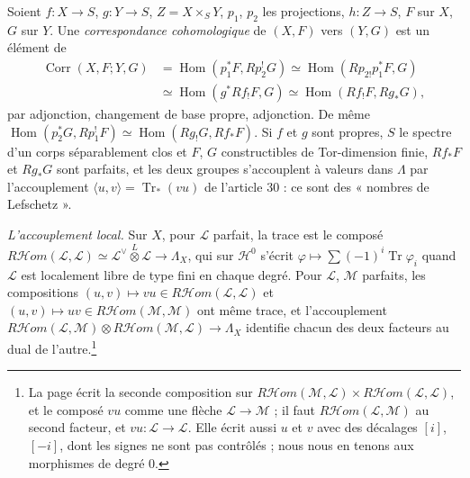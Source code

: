 \documentclass[11pt,a4paper]{article}
\begin{document}
Soient $f : X \to S$, $g : Y \to S$, $Z = X \times_{S} Y$, $p_{1}$, $p_{2}$ les
projections, $h : Z \to S$, $F$ sur $X$, $G$ sur $Y$. Une \emph{correspondance
cohomologique} de $(X, F)$ vers $(Y, G)$ est un élément de
\begin{align*}
  \operatorname{Corr}(X, F; Y, G) &= \operatorname{Hom}(p_{1}^{*}F,
  Rp_{2}^{!}G) \simeq \operatorname{Hom}(Rp_{2!}p_{1}^{*}F, G) \\
  &\simeq \operatorname{Hom}(g^{*}Rf_{!}F, G) \simeq \operatorname{Hom}(Rf_{!}F,
  Rg_{*}G),
\end{align*}
par adjonction, changement de base propre, adjonction. De même
$\operatorname{Hom}(p_{2}^{*}G, Rp_{1}^{!}F) \simeq \operatorname{Hom}(Rg_{!}G,
Rf_{*}F)$. Si $f$ et $g$ sont propres, $S$ le spectre d'un corps séparablement
clos et $F$, $G$ constructibles de Tor-dimension finie, $Rf_{*}F$ et
$Rg_{*}G$ sont parfaits, et les deux groupes s'accouplent à valeurs dans
$\Lambda$ par l'accouplement $\langle u, v\rangle = \operatorname{Tr}_{*}(vu)$ de
l'article 30 : ce sont des « nombres de Lefschetz ».

\emph{L'accouplement local.} Sur $X$, pour $\mathcal{L}$ parfait, la trace est
le composé $R\mathcal{H}om(\mathcal{L}, \mathcal{L}) \simeq
\mathcal{L}^{\vee} \overset{L}{\otimes} \mathcal{L} \to \Lambda_{X}$, qui sur
$\mathcal{H}^{0}$ s'écrit $\varphi \mapsto \sum(-1)^{i}\operatorname{Tr}
\varphi_{i}$ quand $\mathcal{L}$ est localement libre de type fini en chaque
degré. Pour $\mathcal{L}$, $\mathcal{M}$ parfaits, les compositions $(u, v)
\mapsto vu \in R\mathcal{H}om(\mathcal{L}, \mathcal{L})$ et $(u, v) \mapsto uv
\in R\mathcal{H}om(\mathcal{M}, \mathcal{M})$ ont même trace, et l'accouplement
$R\mathcal{H}om(\mathcal{L}, \mathcal{M}) \otimes R\mathcal{H}om(\mathcal{M},
\mathcal{L}) \to \Lambda_{X}$ identifie chacun des deux facteurs au dual de
l'autre.\footnote{La page écrit la seconde composition sur
$R\mathcal{H}om(\mathcal{M}, \mathcal{L}) \times R\mathcal{H}om(\mathcal{L},
\mathcal{L})$, et le composé $v u$ comme une flèche $\mathcal{L} \to
\mathcal{M}$ ; il faut $R\mathcal{H}om(\mathcal{L}, \mathcal{M})$ au second
facteur, et $vu : \mathcal{L} \to \mathcal{L}$. Elle écrit aussi $u$ et $v$
avec des décalages $[i]$, $[-i]$, dont les signes ne sont pas contrôlés ; nous
nous en tenons aux morphismes de degré $0$.}
\end{document}
